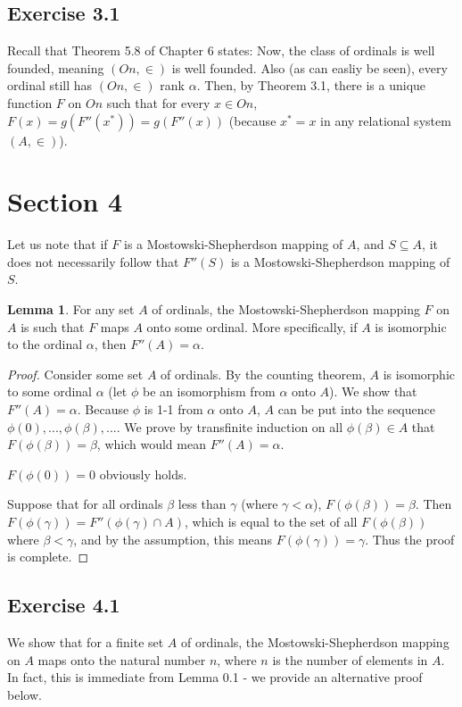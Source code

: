 \documentclass{article}
\theoremstyle{definition}
\newtheorem{lemma}[theorem]{Lemma}
\begin{document}
\subsection*{Exercise 3.1}
Recall that Theorem 5.8 of Chapter 6 states:  Now, the class of ordinals is well founded, meaning 
$(On,\in)$ is well founded. Also (as can easliy be seen), every ordinal still has $(On,\in)$ rank $\alpha$. Then, by Theorem 3.1, 
there is a unique function $F$ on $On$ such that for every $x\in On$, $F(x)=g(F''(x^*))=g(F''(x))$ (because $x^*=x$ in any relational 
system $(A,\in)$).

\section*{Section 4}
Let us note that if $F$ is a Mostowski-Shepherdson mapping of $A$, and $S\subseteq A$, it does not necessarily 
follow that $F''(S)$ is a Mostowski-Shepherdson mapping of $S$.

\begin{lemma}
For any set $A$ of ordinals, the Mostowski-Shepherdson mapping $F$ on $A$ is such that $F$ maps $A$ onto some ordinal. More
specifically, if $A$ is isomorphic to the ordinal $\alpha$, then $F''(A)=\alpha$.
\end{lemma}
\begin{proof}
Consider some set $A$ of ordinals. By the counting theorem, $A$ is isomorphic to some ordinal
$\alpha$ (let $\phi$ be an isomorphism from $\alpha$ onto $A$). We show that $F''(A)=\alpha$.
Because $\phi$ is 1-1 from $\alpha$ onto $A$, $A$ can be put into the sequence $\phi(0),...,\phi(\beta),...$. We prove 
by transfinite induction on all $\phi(\beta)\in A$ that $F(\phi(\beta))=\beta$, which would mean $F''(A)=\alpha$.

$F(\phi(0))=0$ obviously holds.

Suppose that for all ordinals $\beta$ less than $\gamma$ (where $\gamma<\alpha$), $F(\phi(\beta))=\beta$. Then
$F(\phi(\gamma))=F''(\phi(\gamma)\cap A)$, which is equal to the set of all $F(\phi(\beta))$ where $\beta<\gamma$, and by the
assumption, this means $F(\phi(\gamma))=\gamma$. Thus the proof is complete.
\end{proof}

\subsection*{Exercise 4.1}
We show that for a finite set $A$ of ordinals, the Mostowski-Shepherdson mapping on $A$ maps onto the natural number 
$n$, where $n$ is the number of elements in $A$. In fact, this is immediate from Lemma 0.1 - we provide an alternative proof below.
\end{document}
